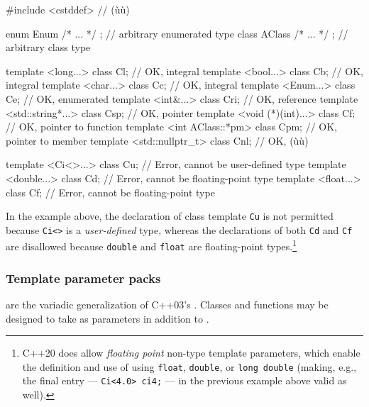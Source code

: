 \begin{emcppslisting}
#include <cstddef>                      // (ù{}ù)

enum Enum { /* ... */ };                  // arbitrary enumerated type
class AClass { /* ... */ };               // arbitrary class type

template <long...>          class Cl;   // OK, integral
template <bool...>          class Cb;   // OK, integral
template <char...>          class Cc;   // OK, integral
template <Enum...>          class Ce;   // OK, enumerated
template <int&...>          class Cri;  // OK, reference
template <std::string*...>  class Csp;  // OK, pointer
template <void (*)(int)...> class Cf;   // OK, pointer to function
template <int AClass::*pm>  class Cpm;  // OK, pointer to member
template <std::nullptr_t>   class Cnl;  // OK, (ù{}ù)

template <Ci<>...>          class Cu;   // Error, cannot be user-defined type
template <double...>        class Cd;   // Error, cannot be floating-point type
template <float...>         class Cf;   // Error, cannot be floating-point type
\end{emcppslisting}
    

\noindent In the example above, the declaration of class template \lstinline!Cu! is
not permitted because \lstinline!Ci<>! is a \emph{user-defined} type,
whereas the declarations of both \lstinline!Cd! and \lstinline!Cf! are
disallowed because \lstinline!double! and \lstinline!float! are floating-point
types.{\cprotect\footnote{C++20 does allow \emph{floating point}
non-type template parameters, which enable the definition and use of
 using \lstinline!float!,
\lstinline!double!, or \lstinline!long!~\lstinline!double! (making, e.g., the
final entry --- \lstinline!Ci<4.0>!~\lstinline!ci4;! --- in the previous
  example above valid as well).}}

\subsubsection[Template parameter packs]{Template parameter packs}\label{template-parameter-packs}

 are the variadic generalization of
C++03's . Classes and functions may
be designed to take  as parameters in
addition to .

